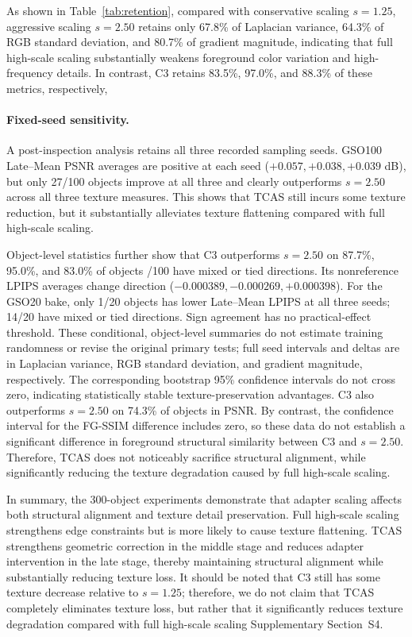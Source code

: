 \documentclass[times,twocolumn,final]{elsarticle}
\providecommand{\DIFadd}[1]{{\protect\color{blue} \sf #1}} %
\providecommand{\DIFdel}[1]{{\protect\color{red} \scriptsize #1}} %
\providecommand{\DIFaddbegin}{} %
\providecommand{\DIFaddend}{} %
\providecommand{\DIFdelbegin}{} %
\providecommand{\DIFdelend}{} %
\begin{document}
\DIFdelbegin \DIFdel{As shown in Table~\ref{tab:retention}, compared with conservative scaling $s = 1.25$, aggressive scaling $s = 2.50$ retains only 67.8\% of Laplacian variance, 64.3\% of RGB standard deviation, and 80.7\% of gradient magnitude, indicating that full high-scale scaling substantially weakens foreground color variation and high-frequency details. In contrast, C3 retains 83.5\%, 97.0\%, and 88.3\% of these metrics, respectively, }\DIFdelend \DIFaddbegin \paragraph{Fixed-seed sensitivity.}
\DIFadd{A post-inspection analysis retains all three recorded sampling seeds. GSO100 Late--Mean PSNR averages are positive at each seed ($+0.057,+0.038,+0.039$ dB), but only 27/100 objects improve at all three }\DIFaddend and \DIFdelbegin \DIFdel{clearly outperforms $s = 2.50$ across all three texture measures. This shows that TCAS still incurs some texture reduction, but it substantially alleviates texture flattening compared with full high-scale scaling.
}%

\DIFdel{Object-level statistics further show that C3 outperforms $s = 2.50$ on 87.7\%, 95.0\%, and 83.0\% of objects }\DIFdelend \DIFaddbegin \DIFadd{68/100 have mixed or tied directions. Its nonreference LPIPS averages change direction ($-0.000389,-0.000269,+0.000398$). For the GSO20 bake, only 1/20 objects has lower Late--Mean LPIPS at all three seeds; 14/20 have mixed or tied directions. Sign agreement has no practical-effect threshold. These conditional, object-level summaries do not estimate training randomness or revise the original primary tests; full seed intervals and deltas are }\DIFaddend in \DIFdelbegin \DIFdel{Laplacian variance, RGB standard deviation, and gradient magnitude, respectively.
The corresponding bootstrap 95\% confidence intervals do not cross zero, indicating statistically stable texture-preservation advantages. C3 also outperforms $s = 2.50$ on 74.3\% of objects in PSNR. By contrast, the confidence interval for the FG-SSIM difference includes zero, so these data do not establish a significant difference in foreground structural similarity between C3 and $s = 2.50$. Therefore, TCAS does not noticeably sacrifice structural alignment, while significantly reducing the texture degradation caused by full high-scale scaling. }%

\DIFdel{In summary, the 300-object experiments demonstrate that adapter scaling affects both structural alignment and texture detail preservation. Full high-scale scaling strengthens edge constraints but is more likely to cause texture flattening. TCAS strengthens geometric correction in the middle stage and reduces adapter intervention in the late stage, thereby maintaining structural alignment while substantially reducing texture loss. It should be noted that C3 still has some texture decrease relative to $s = 1.25$; therefore, we do not claim that TCAS completely eliminates texture loss, but rather that it significantly reduces texture degradation compared with full high-scale scaling}\DIFdelend \DIFaddbegin \DIFadd{Supplementary Section~S4}\DIFaddend .
\end{document}
